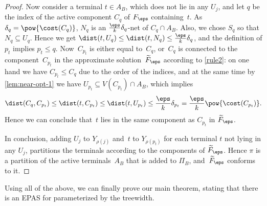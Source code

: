 \begin{proof}
Now consider a terminal $t\in A_B$, which does not lie in any $U_j$, and let $q$ be the index of the active 
component $C_q$ of $F_\eps$ containing~$t$. As $\delta_q=\pow{\cost(C_q)}$, $N_q$ is an $\frac{\eps}{k}\delta_q$-net of 
$C_q\cap A_B$. Also, we chose $S_q$ so that $N_q\subseteq U_q$. Hence we get 
$\dist(t,U_q)\leq\dist(t,N_q)\leq\frac{\eps}{k}\delta_q$, and the definition of $p_t$ implies $p_t\leq q$.
Now~$C_{p_t}$ is either equal to~$C_q$, or~$C_q$ is connected to the component~$C_{p_t}$ in the approximate solution~$\widetilde{F}_\eps$
according to \autoref{rule2}: on one hand we have $C_{p_t}\leq C_q$ due to the order of the indices, and at the same time by 
\autoref{lem:near-opt-1} we have $U_{p_t}\subseteq V(C_{p_t})\cap A_B$, which implies
\[
\dist(C_q,C_{p_t})\leq\dist(t,C_{p_t})\leq\dist(t,U_{p_t})\leq\frac{\eps}{k}\delta_{p_t}=\frac{\eps}{k}\pow{\cost(C_{p_t})}.
\]
Hence we can conclude that~$t$ lies in the same component as $C_{p_t}$ in $\widetilde{F}_\eps$. 

In conclusion, adding $U_j$ to $Y_{\rho(j)}$ and~$t$ to $Y_{\rho(p_t)}$ for each terminal $t$ not lying in any $U_j$, 
partitions the terminals according to the components of $\widetilde{F}_\eps$.
Hence $\pi$ is a partition of the active terminals~$A_B$ that is added to $\Pi_B$, and~$\widetilde{F}_\eps$ conforms to it.
\end{proof}

Using all of the above, we can finally prove our main theorem, stating that there is an EPAS for \SF parameterized by the treewidth.

